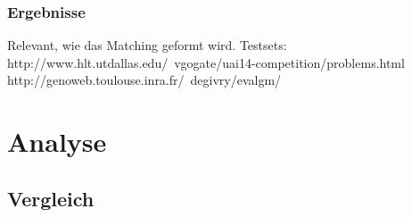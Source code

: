 \documentclass[a4paper]{article}
\begin{document}
\subsubsection{Ergebnisse}
Relevant, wie das Matching geformt wird. 
Testsets:
http://www.hlt.utdallas.edu/~vgogate/uai14-competition/problems.html
http://genoweb.toulouse.inra.fr/~degivry/evalgm/

\section{Analyse}

\subsection{Vergleich}

\newpage
\printbibliography
\end{document}
